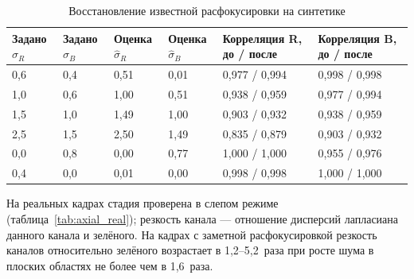 \documentclass[a4paper,14pt,oneside]{extreport}
\begin{document}
\begin{table}[H]
\caption{Восстановление известной расфокусировки на синтетике}
\label{tab:axial_syn}
\small
\begin{tabular}{|p{1.5cm}|p{1.5cm}|p{1.5cm}|p{1.5cm}|p{3.1cm}|p{3.1cm}|}
\hline
Задано $\sigma_R$ & Задано $\sigma_B$ & Оценка $\hat\sigma_R$ & Оценка $\hat\sigma_B$ & Корреляция R, до / после & Корреляция B, до / после \\
\hline
0,6 & 0,4 & 0,51 & 0,01 & 0,977 / 0,994 & 0,998 / 0,998 \\
\hline
1,0 & 0,6 & 1,00 & 0,51 & 0,938 / 0,959 & 0,977 / 0,994 \\
\hline
1,5 & 1,0 & 1,49 & 1,00 & 0,903 / 0,932 & 0,938 / 0,959 \\
\hline
2,5 & 1,5 & 2,50 & 1,49 & 0,835 / 0,879 & 0,903 / 0,932 \\
\hline
0,0 & 0,8 & 0,00 & 0,77 & 1,000 / 1,000 & 0,955 / 0,976 \\
\hline
0,4 & 0,0 & 0,01 & 0,00 & 0,998 / 0,998 & 1,000 / 1,000 \\
\hline
\end{tabular}
\end{table}

На реальных кадрах стадия проверена в слепом режиме
(таблица~\ref{tab:axial_real}); резкость канала --- отношение дисперсий
лапласиана данного канала и зелёного. На кадрах с заметной расфокусировкой
резкость каналов относительно зелёного возрастает в 1,2--5,2~раза при росте
шума в плоских областях не более чем в 1,6~раза.
\end{document}

